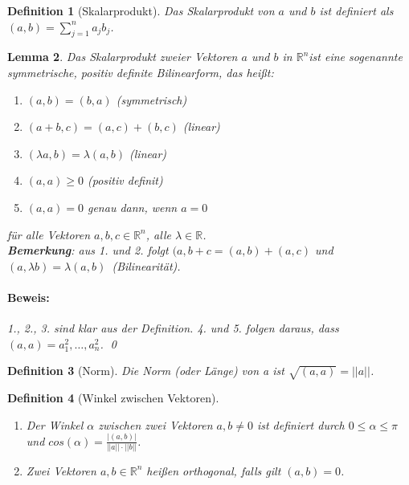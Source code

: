 \documentclass{report}
\newcommand{\IN}[1]{\index{#1|BH}}
\newcommand{\lb}{\lambda}
\newcommand{\R}{\mathbb{R}}
\newcommand{\Rn}{\mathbb{R}^n}
\newcommand{\mRn}{$\mathbb{R}^n$}
\newcommand{\al}{\alpha}
\theoremstyle{customrem}
\theoremstyle{customdef}
\newtheorem{definition}{Definition}[chapter]
\newtheorem{lemma}[definition]{Lemma}
\renewenvironment{proof}{\paragraph{Beweis: }}{\qed}
\begin{document}
	\begin{definition}[Skalarprodukt]
		\IN{Skalarprodukt}
		Das Skalarprodukt von $a$ und $b$ ist definiert als $(a, b) = \sum_{j=1}^n a_j b_j$.
	\end{definition}
	
	\begin{lemma}
		Das Skalarprodukt zweier Vektoren $a$ und $b$ in \mRn ist eine sogenannte symmetrische, positiv definite Bilinearform, das heißt:
		\begin{enumerate}
			\item $(a, b) = (b, a)$ (symmetrisch) 
			\item $(a + b, c) = (a, c) + (b, c)$ (linear) 
			\item $(\lb a, b) = \lb(a, b)$ (linear) 
			\item $(a, a) \ge 0$ (positiv definit) 
			\item $(a, a) = 0$ genau dann, wenn $a=0$ 
		\end{enumerate}
		für alle Vektoren $a, b, c \in \Rn$, alle $\lb \in \R$.\\
		\textbf{Bemerkung}: aus 1. und 2. folgt $(a, b+c = (a,b) + (a,c)$ und $(a, \lb b) = \lb (a, b)$\ (Bilinearität).\\
		\begin{proof}
			1., 2., 3. sind klar aus der Definition. 4. und 5. folgen daraus, dass $(a, a) = a_1^2, \ldots, a_n^2$.
		\end{proof}
	\end{lemma}
	\vspace{.2cm}
	\begin{definition}[Norm]
		Die Norm (oder Länge) von a ist $\sqrt{(a, a)} = ||a||$.
	\end{definition}
	
	\begin{definition}[Winkel zwischen Vektoren]$ $\vspace{-.5cm}
		\begin{enumerate}
			\item Der Winkel $\al$ zwischen zwei Vektoren $a, b \neq 0$ ist definiert durch $0 \le \al \le \pi$ und $cos(\al) = \frac{|(a,b)|}{||a||\cdot ||b||}$.
			\item Zwei Vektoren $a, b \in \R^n$ heißen orthogonal, falls gilt $(a, b) = 0$.
		\end{enumerate}
	\end{definition}
	
\end{document}
